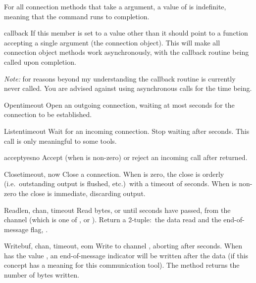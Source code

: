 For all connection methods that take a  argument, a value
of  is indefinite, meaning that the command runs to completion.

\begin{memberdesc}[connection]{callback}
If this member is set to a value other than  it should point
to a function accepting a single argument (the connection
object). This will make all connection object methods work
asynchronously, with the callback routine being called upon
completion.

\emph{Note:} for reasons beyond my understanding the callback routine
is currently never called. You are advised against using asynchronous
calls for the time being.
\end{memberdesc}


\begin{methoddesc}[connection]{Open}{timeout}
Open an outgoing connection, waiting at most  seconds for
the connection to be established.
\end{methoddesc}

\begin{methoddesc}[connection]{Listen}{timeout}
Wait for an incoming connection. Stop waiting after 
seconds. This call is only meaningful to some tools.
\end{methoddesc}

\begin{methoddesc}[connection]{accept}{yesno}
Accept (when  is non-zero) or reject an incoming call after
 returned.
\end{methoddesc}

\begin{methoddesc}[connection]{Close}{timeout, now}
Close a connection. When  is zero, the close is orderly
(i.e.\ outstanding output is flushed, etc.)\ with a timeout of
 seconds. When  is non-zero the close is
immediate, discarding output.
\end{methoddesc}

\begin{methoddesc}[connection]{Read}{len, chan, timeout}
Read  bytes, or until  seconds have passed, from 
the channel  (which is one of ,
 or ). Return a 2-tuple:\ the data
read and the end-of-message flag, .
\end{methoddesc}

\begin{methoddesc}[connection]{Write}{buf, chan, timeout, eom}
Write  to channel , aborting after 
seconds. When  has the value , an
end-of-message indicator will be written after the data (if this
concept has a meaning for this communication tool). The method returns
the number of bytes written.
\end{methoddesc}

